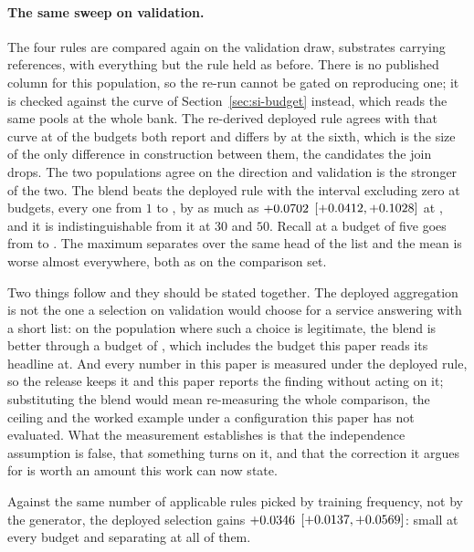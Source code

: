 \documentclass[journal=jcisd8,manuscript=suppinfo,layout=onecolumn]{achemso}
\begin{document}
\paragraph{The same sweep on validation.} The four rules are compared again on the validation
draw, \numAggvalSubstrates{} substrates carrying \numAggvalReferences{} references, with
everything but the rule held as before. There is no published column for this population, so the
re-run cannot be gated on reproducing one; it is checked against the curve of
Section~\ref{sec:si-budget} instead, which reads the same pools at the whole bank. The re-derived
deployed rule agrees with that curve at \numAggvalCheckagreeWord{} of the
\numAggvalCheckbudgetsWord{} budgets both report and differs by \numAggvalCheckworst{} at the
sixth, which is the size of the only difference in construction between them, the candidates the
join drops. The two populations agree on the direction and validation
is the stronger of the two. The blend beats the deployed rule with the interval excluding zero at
\numAggvalHybridwinsWord{} budgets, every one from $1$ to \numAggvalHybridwinsmax{}, by as much
as $+0.0702$ $[+0.0412, +0.1028]$ at
\numAggValHybridMaxkWord{}, and it is indistinguishable from it at $30$ and $50$. Recall at a budget
of five goes from
\numAggvalDeployedrecallfive{} to \numAggvalHybridrecallfive{}. The maximum separates over the
same head of the list and the mean is worse almost everywhere, both as on the comparison set.

Two things follow and they should be stated together. The deployed aggregation is not the one a
selection on validation would choose for a service answering with a short list: on the population
where such a choice is legitimate, the blend is better through a budget of
\numAggvalHybridwinsmax{}, which includes the budget this paper reads its headline at. And every
number in this paper is measured under the deployed rule, so the release keeps it and this paper
reports the finding without acting on it; substituting the blend would mean re-measuring the whole
comparison, the ceiling and the worked example under a configuration this paper has not evaluated.
What the measurement establishes is that the independence assumption is false, that something
turns on it, and that the correction it argues for is worth an amount this work can now state.

Against the same number of applicable rules picked by training frequency, not by the generator,
the deployed selection gains $+0.0346$
$[+0.0137, +0.0569]$: small at every budget and
separating at all of them.
\end{document}

